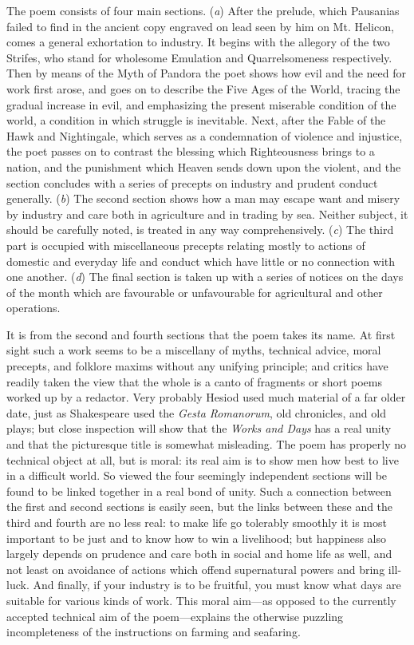 The poem consists of four main sections. (\emph{a}) After the prelude, which
Pausanias failed to find in the ancient copy engraved on lead seen by him on
Mt. Helicon, comes a general exhortation to industry. It begins with the
allegory of the two Strifes, who stand for wholesome Emulation and
Quarrelsomeness respectively. Then by means of the Myth of Pandora the poet
shows how evil and the need for work first arose, and goes on to describe the
Five Ages of the World, tracing the gradual increase in evil, and emphasizing
the present miserable condition of the world, a condition in which struggle is
inevitable. Next, after the Fable of the Hawk and Nightingale, which serves as
a condemnation of violence and injustice, the poet passes on to contrast the
blessing which Righteousness brings to a nation, and the punishment which
Heaven sends down upon the violent, and the section concludes with a series of
precepts on industry and prudent conduct generally. (\emph{b}) The second
section shows how a man may escape want and misery by industry and care both in
agriculture and in trading by sea. Neither subject, it should be carefully
noted, is treated in any way comprehensively. (\emph{c}) The third part is
occupied with miscellaneous precepts relating mostly to actions of domestic and
everyday life and conduct which have little or no connection with one another.
(\emph{d}) The final section is taken up with a series of notices on the days
of the month which are favourable or unfavourable for agricultural and other
operations.

It is from the second and fourth sections that the poem takes its name. At
first sight such a work seems to be a miscellany of myths, technical advice,
moral precepts, and folklore maxims without any unifying principle; and critics
have readily taken the view that the whole is a canto of fragments or short
poems worked up by a redactor. Very probably Hesiod used much material of a far
older date, just as Shakespeare used the \emph{Gesta Romanorum}, old
chronicles, and old plays; but close inspection will show that the \emph{Works and
Days} has a real unity and that the picturesque title is somewhat
misleading. The poem has properly no technical object at all, but is moral: its
real aim is to show men how best to live in a difficult world. So viewed the
four seemingly independent sections will be found to be linked together in a
real bond of unity. Such a connection between the first and second sections is
easily seen, but the links between these and the third and fourth are no less
real: to make life go tolerably smoothly it is most important to be just and to
know how to win a livelihood; but happiness also largely depends on prudence
and care both in social and home life as well, and not least on avoidance of
actions which offend supernatural powers and bring ill-luck. And finally, if
your industry is to be fruitful, you must know what days are suitable for
various kinds of work. This moral aim—as opposed to the currently
accepted technical aim of the poem—explains the otherwise puzzling
incompleteness of the instructions on farming and seafaring.

